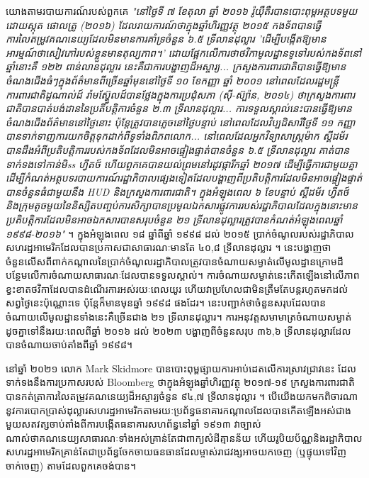 \documentclass[10pt,twocolumn,letterpaper]{article}
\begin{document}
យោងតាមរបាយការណ៍របស់ពួកគេ \textit{"នៅថ្ងៃទី ៧ ខែតុលា ឆ្នាំ ២០១៦ រ៉ូយ៉ឺតឺរបានបោះពុម្ពអត្ថបទមួយដោយស្កុត ផោលត្រូ (២០១៦) ដែលរាយការណ៍ថាក្នុងឆ្នាំហិរញ្ញវត្ថុ ២០១៥ កងទ័ពបានធ្វើការលៃតម្រូវគណនេយ្យដែលមិនមានការគាំទ្រចំនួន ៦.៥ ទ្រីលានដុល្លារ 'ដើម្បីបង្កើតឱ្យមានអារម្មណ៍ថាសៀវភៅរបស់ខ្លួនមានតុល្យភាព។' ដោយផ្អែកលើការថាថវិកាមូលដ្ឋានទូទៅរបស់កងទ័ពនៅឆ្នាំនោះគឺ ១២២ ពាន់លានដុល្លារ នេះគឺជាការបង្ហាញដ៏អស្ចារ្យ... ក្រសួងការពារជាតិបានធ្វើឱ្យមានចំណងជើងធំៗក្នុងព័ត៌មានពីច្រើនឆ្នាំមុននៅថ្ងៃទី ១០ ខែកញ្ញា ឆ្នាំ ២០០១ នៅពេលដែលរដ្ឋមន្ត្រីការពារជាតិដូណាល់ដ៍ រ៉ាមស្ហ៊្វែលដ៍បានថ្លែងក្នុងការប្រជុំសភា (ស៊ី-ស៊្ប៉ាន, ២០១៤) ថាក្រសួងការពារជាតិបានបាត់បង់ដាននៃប្រតិបត្តិការចំនួន ២.៣ ទ្រីលានដុល្លារ... ការទទួលស្គាល់នេះបានធ្វើឱ្យមានចំណងជើងព័ត៌មាននៅថ្ងៃនោះ ប៉ុន្តែត្រូវបានភ្លេចនៅថ្ងៃបន្ទាប់ នៅពេលដែលវិប្បដិសារីថ្ងៃទី ១១ កញ្ញាបានទាក់ទាញការយកចិត្តទុកដាក់ពីទូទាំងពិភពលោក... នៅពេលដែលអ្នកវិទ្យាសាស្ត្រម៉ាក ស្គីដម័របានដឹងអំពីប្រតិបត្តិការរបស់កងទ័ពដែលមិនអាចផ្ទៀងផ្ទាត់បានចំនួន ៦.៥ ទ្រីលានដុល្លារ គាត់បានទាក់ទងទៅកាន់មិss ហ្វីតថ៍ ហើយពួកគេបានយល់ព្រមនៅរដូវផ្ការីកឆ្នាំ ២០១៧ ដើម្បីធ្វើការជាមួយគ្នាដើម្បីកំណត់អត្ថបទរបាយការណ៍រដ្ឋាភិបាលផ្សេងទៀតដែលបង្ហាញពីប្រតិបត្តិការដែលមិនអាចផ្ទៀងផ្ទាត់បានចំនួនធំជាមួយនឹង HUD និងក្រសួងការពារជាតិ។ ក្នុងអំឡុងពេល ៦ ខែបន្ទាប់ ស្គីដម័រ ហ្វីតថ៍ និងក្រុមតូចមួយនៃនិស្សិតបញ្ចប់ការសិក្សាបានប្រមូលឯកសារផ្លូវការរបស់រដ្ឋាភិបាលដែលក្នុងនោះមានប្រតិបត្តិការដែលមិនអាចឯកសារបានសរុបចំនួន ២១ ទ្រីលានដុល្លារត្រូវបានកំណត់អំឡុងពេលឆ្នាំ ១៩៩៨-២០១៦"} \cite{12}។
ក្នុងអំឡុងពេល ១៨ ឆ្នាំពីឆ្នាំ ១៩៩៨ ដល់ ២០១៥ ប្រាក់ចំណូលរបស់រដ្ឋាភិបាលសហរដ្ឋអាមេរិកដែលបានប្រកាសជាសាធារណៈមានតែ ៤០,៨ ទ្រីលានដុល្លារ \cite{15}។ នេះបង្ហាញថាចំនួនលើសពីពាក់កណ្តាលនៃប្រាក់ចំណូលរដ្ឋាភិបាលត្រូវបានចំណាយសម្ងាត់លើមូលដ្ឋានក្រោមដី បន្ថែមលើការចំណាយសាធារណៈដែលបានទទួលស្គាល់។ ការចំណាយសម្ងាត់នេះកើតឡើងនៅលើភាពខ្វះខាតថវិកាដែលបានដំណើរការអស់រយៈពេលយូរ ហើយវាប្រហែលជាមិនត្រឹមតែបន្តរហូតមកដល់សព្វថ្ងៃនេះប៉ុណ្ណោះទេ ប៉ុន្តែក៏មានមុនឆ្នាំ ១៩៩៨ ផងដែរ។ នេះបញ្ជាក់ថាចំនួនសរុបដែលបានចំណាយលើមូលដ្ឋានទាំងនេះគឺច្រើនជាង ២១ ទ្រីលានដុល្លារ។ ការអនុវត្តសមាមាត្រចំណាយសម្ងាត់ដូចគ្នាទៅនឹងរយៈពេលពីឆ្នាំ ២០១៦ ដល់ ២០២៣ បង្ហាញពីចំនួនសរុប ៣៦,៦ ទ្រីលានដុល្លារដែលបានចំណាយចាប់តាំងពីឆ្នាំ ១៩៩៨។

នៅឆ្នាំ ២០២១ លោក Mark Skidmore បានបោះពុម្ពផ្សាយការអាប់ដេតលើការស្រាវជ្រាវនេះ ដែលទាក់ទងនឹងការប្រកាសរបស់ Bloomberg ថាក្នុងអំឡុងឆ្នាំហិរញ្ញវត្ថុ ២០១៧-១៩ ក្រសួងការពារជាតិបានកត់ត្រាការលៃតម្រូវគណនេយ្យដ៏អស្ចារ្យចំនួន ៩៤,៧ ទ្រីលានដុល្លារ \cite{17,18}។ បើយើងយកមកពិចារណានូវការបោកប្រាស់ដុល្លារសហរដ្ឋអាមេរិកតាមរយៈប្រព័ន្ធធនាគារកណ្តាលដែលបានកើតឡើងអស់ជាងមួយសតវត្សចាប់តាំងពីការបង្កើតធនាគារសហព័ន្ធនៅឆ្នាំ ១៩១៣ \cite{37} វាច្បាស់ណាស់ថាគណនេយ្យសាធារណៈទាំងអស់គ្រាន់តែជាពាក្យសំដីគ្មានន័យ ហើយរូបិយប័ណ្ណនិងរដ្ឋាភិបាលសហរដ្ឋអាមេរិកគ្រាន់តែជាប្រព័ន្ធចែកចាយធនធានដែលម្ចាស់រាជវង្សអាចយកចេញ (ឬផ្ទុយទៅវិញ ចាក់ចេញ) តាមដែលពួកគេចង់បាន។
\end{document}
